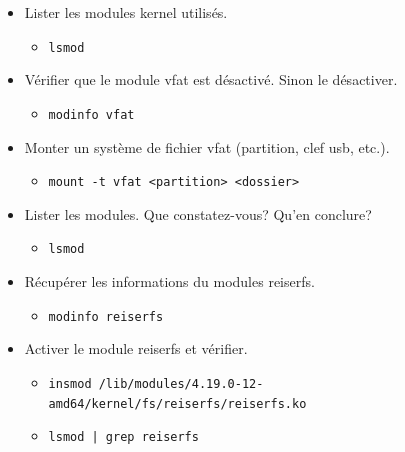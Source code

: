 \documentclass[a4paper]{article}
\begin{document}
\begin{itemize}

\item Lister les modules kernel utilisés.
\begin{example}
    \begin{itemize}
        \item \texttt{lsmod}
    \end{itemize}
\end{example}

\item Vérifier que le module vfat est désactivé. Sinon le désactiver.
\begin{example}
    \begin{itemize}
        \item \texttt{modinfo vfat}
    \end{itemize}
\end{example}

\item Monter un système de fichier vfat (partition, clef usb, etc.).
\begin{example}
    \begin{itemize}
        \item \texttt{mount -t vfat <partition> <dossier>}
    \end{itemize}
\end{example}

\item Lister les modules. Que constatez-vous? Qu'en conclure?
\begin{example}
    \begin{itemize}
        \item \texttt{lsmod}
    \end{itemize}
\end{example}

\item Récupérer les informations du modules reiserfs.
\begin{example}
    \begin{itemize}
        \item \texttt{modinfo reiserfs}
    \end{itemize}
\end{example}

\item Activer le module reiserfs et vérifier.
\begin{example}
    \begin{itemize}
        \item \texttt{insmod /lib/modules/4.19.0-12-amd64/kernel/fs/reiserfs/reiserfs.ko}
        \item \texttt{lsmod | grep reiserfs}
    \end{itemize}
\end{example}

\end{itemize}
\end{document}
